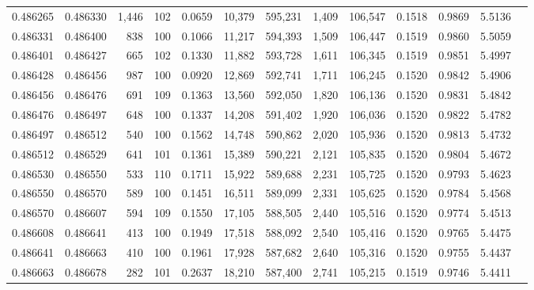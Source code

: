 \begin{tabular}{rrrrrrrrrrrrr}
0.486265 & 0.486330 & 1,446 & 102 &                                     0.0659 &  10,379 & 595,231 &   1,409 & 106,547 & 0.1518 & 0.9869 & 5.5136 \\
0.486331 & 0.486400 &   838 & 100 &                                     0.1066 &  11,217 & 594,393 &   1,509 & 106,447 & 0.1519 & 0.9860 & 5.5059 \\
0.486401 & 0.486427 &   665 & 102 &                                     0.1330 &  11,882 & 593,728 &   1,611 & 106,345 & 0.1519 & 0.9851 & 5.4997 \\
0.486428 & 0.486456 &   987 & 100 &                                     0.0920 &  12,869 & 592,741 &   1,711 & 106,245 & 0.1520 & 0.9842 & 5.4906 \\
0.486456 & 0.486476 &   691 & 109 &                                     0.1363 &  13,560 & 592,050 &   1,820 & 106,136 & 0.1520 & 0.9831 & 5.4842 \\
0.486476 & 0.486497 &   648 & 100 &                                     0.1337 &  14,208 & 591,402 &   1,920 & 106,036 & 0.1520 & 0.9822 & 5.4782 \\
0.486497 & 0.486512 &   540 & 100 &                                     0.1562 &  14,748 & 590,862 &   2,020 & 105,936 & 0.1520 & 0.9813 & 5.4732 \\
0.486512 & 0.486529 &   641 & 101 &                                     0.1361 &  15,389 & 590,221 &   2,121 & 105,835 & 0.1520 & 0.9804 & 5.4672 \\
0.486530 & 0.486550 &   533 & 110 &                                     0.1711 &  15,922 & 589,688 &   2,231 & 105,725 & 0.1520 & 0.9793 & 5.4623 \\
0.486550 & 0.486570 &   589 & 100 &                                     0.1451 &  16,511 & 589,099 &   2,331 & 105,625 & 0.1520 & 0.9784 & 5.4568 \\
0.486570 & 0.486607 &   594 & 109 &                                     0.1550 &  17,105 & 588,505 &   2,440 & 105,516 & 0.1520 & 0.9774 & 5.4513 \\
0.486608 & 0.486641 &   413 & 100 &                                     0.1949 &  17,518 & 588,092 &   2,540 & 105,416 & 0.1520 & 0.9765 & 5.4475 \\
0.486641 & 0.486663 &   410 & 100 &                                     0.1961 &  17,928 & 587,682 &   2,640 & 105,316 & 0.1520 & 0.9755 & 5.4437 \\
0.486663 & 0.486678 &   282 & 101 &                                     0.2637 &  18,210 & 587,400 &   2,741 & 105,215 & 0.1519 & 0.9746 & 5.4411 \\

\end{tabular}
